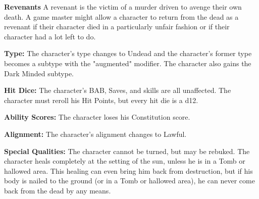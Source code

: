 \textbf{Revenants}
A revenant is the victim of a murder driven to avenge their own death. A game master might allow a character to return from the dead as a revenant if their character died in a particularly unfair fashion or if their character had a lot left to do.
\begin{itemize*}
\item \textbf{Type:} The character's type changes to Undead and the character's former type becomes a subtype with the "augmented" modifier. The character also gains the Dark Minded subtype.
\item \textbf{Hit Dice:} The character's BAB, Saves, and skills are all unaffected. The character must reroll his Hit Points, but every hit die is a d12.
\item \textbf{Ability Scores:} The character loses his Constitution score.
\item \textbf{Alignment:} The character's alignment changes to Lawful.
\item \textbf{Special Qualities:} The character cannot be turned, but may be rebuked. The character heals completely at the setting of the sun, unless he is in a Tomb or hallowed area. This healing can even bring him back from destruction, but if his body is nailed to the ground (or in a Tomb or hallowed area), he can never come back from the dead by any means.
\end{itemize*}

